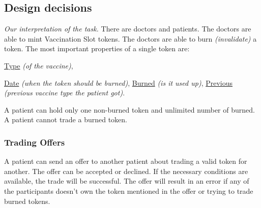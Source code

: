 \newcommand{\function}[4]{
  \textbf{#1}%
  (\emph{#2}):
  #3 \newline
  \emph{\color{teal} #4}
}

\newcommand{\gopkg}[2]{
  \href{https://pkg.go.dev/github.com/perryd01/vaccination-slot/chaincode#1}{#2}%
}

\newcommand{\testStruct}[3]{
  \subsubsection{#1}
  \paragraph*{Steps}
  \begin{enumerate}
    #2
  \end{enumerate}
  \textbf{Expected outcome:} #3
}

\newcommand{\vsType}[0]{\gopkg{\#VaccinationType}{Type}}
\newcommand{\vsDate}[0]{\gopkg{\#VaccinationDate}{Date}}


\subsection{Design decisions}
\emph{Our interpretation of the task.} There are doctors and patients. The doctors are able to mint Vaccination Slot tokens. The doctors are able to burn \emph{(invalidate)} a token. The most important properties of a single token are:%
\vsType \emph{(of the vaccine)},
\vsDate \emph{(when the token should be burned)},
\href{https://pkg.go.dev/github.com/perryd01/vaccination-slot/chaincode\#VaccinationDate}{Burned} \emph{(is it used up)},
\href{https://pkg.go.dev/github.com/perryd01/vaccination-slot/chaincode\#VaccinationSlotData}{Previous} \emph{(previous vaccine type the patient got)}.

A patient can hold only one non-burned token and unlimited number of burned. A patient cannot trade a burned token.

\subsubsection{Trading Offers}
A patient can send an offer to another patient about trading a valid token for another. The offer can be accepted or declined. If the necessary conditions are available, the trade will be successful.
The offer will result in an error if any of the participants doesn't own the token mentioned in the offer or trying to trade burned tokens.


